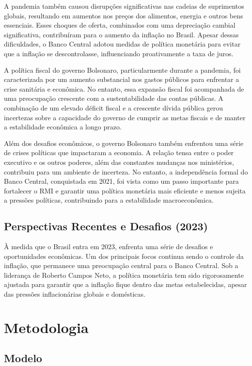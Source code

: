 \documentclass[12pt,oneside,a4paper,chapter=TITLE,english,brazil,sumario=abnt-6027-2012]{abntex2}
\begin{document}
A pandemia também causou disrupções significativas nas cadeias de suprimentos globais, resultando em aumentos nos preços dos alimentos, energia e outros bens essenciais. Esses choques de oferta, combinados com uma depreciação cambial significativa, contribuíram para o aumento da inflação no Brasil. Apesar dessas dificuldades, o Banco Central adotou medidas de política monetária para evitar que a inflação se descontrolasse, influenciando proativamente a taxa de juros.

A política fiscal do governo Bolsonaro, particularmente durante a pandemia, foi caracterizada por um aumento substancial nos gastos públicos para enfrentar a crise sanitária e econômica. No entanto, essa expansão fiscal foi acompanhada de uma preocupação crescente com a sustentabilidade das contas públicas. A combinação de um elevado déficit fiscal e a crescente dívida pública gerou incertezas sobre a capacidade do governo de cumprir as metas fiscais e de manter a estabilidade econômica a longo prazo.

Além dos desafios econômicos, o governo Bolsonaro também enfrentou uma série de crises políticas que impactaram a economia. A relação tensa entre o poder executivo e os outros poderes, além das constantes mudanças nos ministérios, contribuiu para um ambiente de incerteza. No entanto, a independência formal do Banco Central, conquistada em 2021, foi vista como um passo importante para fortalecer o RMI e garantir uma política monetária mais eficiente e menos sujeita a pressões políticas, contribuindo para a estabilidade macroeconômica.

\section{Perspectivas Recentes e Desafios (2023)}

À medida que o Brasil entra em 2023, enfrenta uma série de desafios e oportunidades econômicas. Um dos principais focos continua sendo o controle da inflação, que permanece uma preocupação central para o Banco Central. Sob a liderança de Roberto Campos Neto, a política monetária tem sido rigorosamente ajustada para garantir que a inflação fique dentro das metas estabelecidas, apesar das pressões inflacionárias globais e domésticas.

\chapter{Metodologia}

\section{Modelo}
\end{document}
